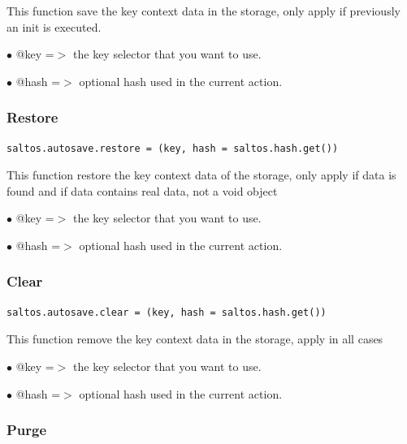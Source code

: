 \documentclass[a4paper]{article}
\begin{document}
This function save the key context data in the storage, only apply if previously
an init is executed.

\begin{compactitem}
\item[\color{myblue}$\bullet$] @key  =$>$ the key selector that you want to use.
\item[\color{myblue}$\bullet$] @hash =$>$ optional hash used in the current action.
\end{compactitem}

\hypertarget{toc38}{}
\subsubsection{Restore}

\begin{lstlisting}
saltos.autosave.restore = (key, hash = saltos.hash.get())
\end{lstlisting}

This function restore the key context data of the storage, only apply if data is found
and if data contains real data, not a void object

\begin{compactitem}
\item[\color{myblue}$\bullet$] @key  =$>$ the key selector that you want to use.
\item[\color{myblue}$\bullet$] @hash =$>$ optional hash used in the current action.
\end{compactitem}

\hypertarget{toc39}{}
\subsubsection{Clear}

\begin{lstlisting}
saltos.autosave.clear = (key, hash = saltos.hash.get())
\end{lstlisting}

This function remove the key context data in the storage, apply in all cases

\begin{compactitem}
\item[\color{myblue}$\bullet$] @key  =$>$ the key selector that you want to use.
\item[\color{myblue}$\bullet$] @hash =$>$ optional hash used in the current action.
\end{compactitem}

\hypertarget{toc40}{}
\subsubsection{Purge}
\end{document}
